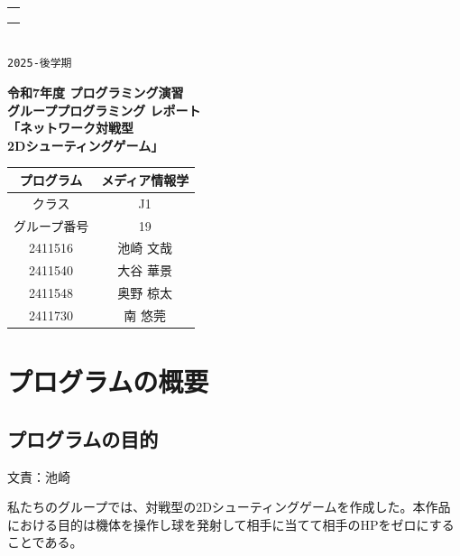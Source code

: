 \documentclass[11pt,a4j]{jarticle}
\begin{document}
\thispagestyle{empty}
\begin{flushright}
\begin{tabular}{|c|}\hline
\hspace*{2cm} \\
\hspace*{2cm} \\
\hspace*{1.7cm} \\ \hline
\end{tabular}\\
{\huge\tt 2025-後学期}
\end{flushright}
\begin{center}
\begin{Huge}
{\bf 令和7年度 プログラミング演習}\\
\vspace{0.5cm}
{\bf グループプログラミング レポート}\\
\vspace{1.5cm}
{\bf 「ネットワーク対戦型\\2Dシューティングゲーム」}\\
\vspace{5cm}

\begin{tabular}{|c|c|}\hline
プログラム&メディア情報学\\ \hline
クラス&  J1    \\ \hline
グループ番号& 19 \\ \hline
2411516& 池崎 文哉 \\ \hline
2411540& 大谷 華景 \\ \hline
2411548& 奥野 椋太 \\ \hline
2411730& 南 悠莞 \\ \hline
\end{tabular}
\end{Huge}
\end{center}
\newpage

\section{プログラムの概要}
\subsection{プログラムの目的}
\begin{flushright}
  文責：池崎
\end{flushright}
私たちのグループでは、対戦型の2Dシューティングゲームを作成した。本作品における目的は機体を操作し球を発射して相手に当てて相手のHPをゼロにすることである。
\end{document}
